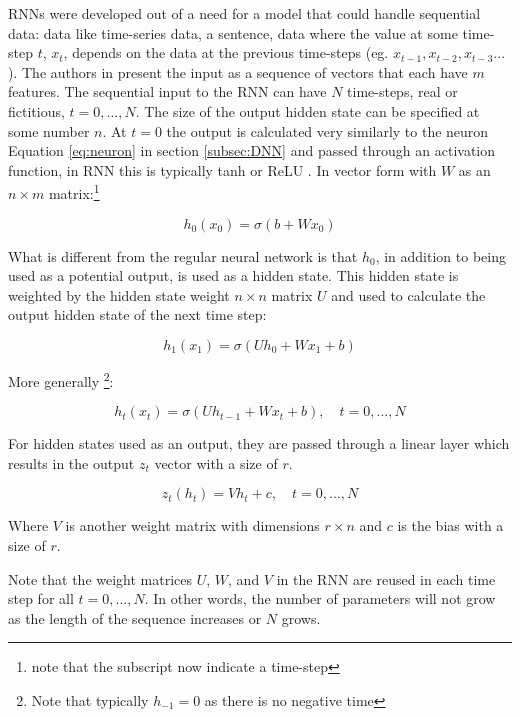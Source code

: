 RNNs were developed out of a need for a model that could handle sequential data: data like time-series data, a sentence, data where the value at some time-step $t$, $x_t$, depends on the data at the previous time-steps (eg. $x_{t-1}, x_{t-2}, x_{t-3}...$). The authors in \cite{salemRecurrentNeuralNetworks2022} present the input as a sequence of vectors that each have $m$ features. The sequential input to the RNN can have $N$ time-steps, real or fictitious, $t=0,...,N$. The size of the output hidden state can be specified at some number $n$. At $t=0$ the output is calculated very similarly to the neuron Equation \ref{eq:neuron} in section \ref{subsec:DNN} and passed through an activation function, in RNN this is typically tanh or ReLU \cite{salemRecurrentNeuralNetworks2022}. In vector form with $W$ as an $n \times m$ matrix:\footnote{note that the subscript now indicate a time-step}

\begin{equation}
    h_0(x_0) = \sigma(b + Wx_0)
\end{equation}

What is different from the regular neural network is that $h_0$, in addition to being used as a potential output,  is used as a hidden state. This hidden state is weighted by the hidden state weight $n \times n$ matrix $U$ and used to calculate the output hidden state of the next time step:

\begin{equation}
    h_1(x_1) = \sigma(Uh_0+Wx_1+b)
\end{equation}

More generally \cite{salemRecurrentNeuralNetworks2022}\footnote{Note that typically $h_{-1}=0$ as there is no negative time}:

\begin{equation}
    \label{eq:rnn-recursive}
    h_t(x_t) = \sigma(Uh_{t-1} + Wx_t+b), \quad t=0,...,N
\end{equation}

For hidden states used as an output, they are passed through a linear layer which results in the output $z_t$ vector with a size of $r$.

\begin{equation}
    z_t(h_t) = Vh_t + c, \quad t = 0,...,N
\end{equation}

Where $V$ is another weight matrix with dimensions $r \times n$ and $c$ is the bias with a size of $r$.

Note that the weight matrices $U$, $W$, and $V$ in the RNN are reused in each time step for all $t=0,...,N$. In other words, the number of parameters will not grow as the length of the sequence increases or $N$ grows.


